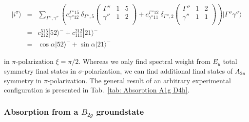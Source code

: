 \documentclass[twocolumn,prb,twocolumn,amsmath,superscriptaddress,nofootinbib,amssymb]{revtex4-1}
\begin{document}
\begin{widetext}
\begin{eqnarray}
|i^{\pi}\rangle&=&\sum_{\Gamma'',\gamma''} \left(c^{\Gamma''15}_{\gamma''12}~\delta_{\Gamma'',5} \left(
                                                                             \begin{array}{ccc}
                                                                               \Gamma'' & 1 & 5 \\
                                                                                \gamma''& 1 & 2 \\
                                                                             \end{array}
                                                                           \right)+
c^{\Gamma''12}_{\gamma''11}~\delta_{\Gamma'',2} \left(
                                                                             \begin{array}{ccc}
                                                                               \Gamma'' & 1 & 2 \\
                                                                                \gamma''& 1 & 1 \\
                                                                             \end{array}
                                                                           \right)\right)|\Gamma''\gamma''\rangle \nonumber\\                                                                      &=& c^{515}_{212} |52\rangle^- +c^{212}_{111} |21\rangle^-  \nonumber\\
&=&  \cos\alpha  |52\rangle^-  + \sin\alpha |21\rangle^-
\end{eqnarray}

\noindent in $\pi$-polarization $\xi=\pi/2$.
Whereas we only find spectral weight from $E_u$ total symmetry final states in $\sigma$-polarization, we can find additional final states of $A_{2u}$ symmetry in $\pi$-polarization. The general result of an arbitrary experimental configuration is presented in Tab.~\ref{tab: Absorption A1g D4h}.


\subsubsection{Absorption from a $B_{2g}$ groundstate}

\begin{table*}[htbp]
\end{table*}
\end{widetext}
\end{document}
